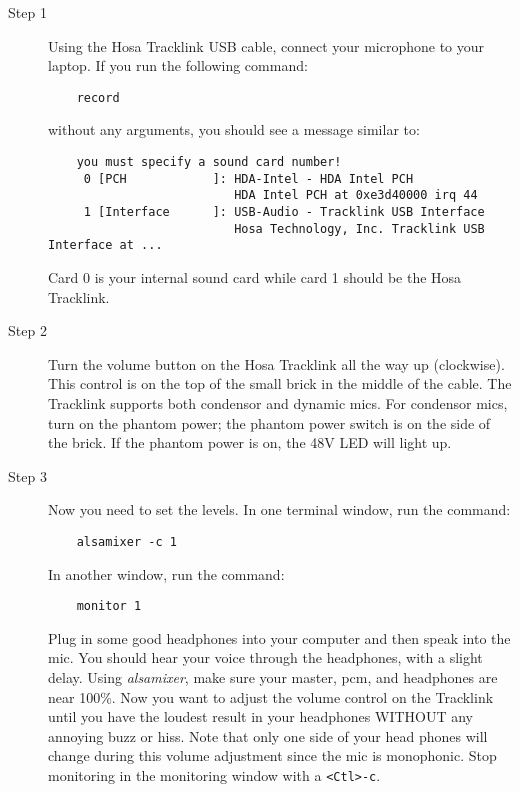 \documentclass{article}
\begin{document}
\begin{description}

\item[Step 1]

Using the Hosa Tracklink USB cable, connect your microphone
to your laptop.  If you run the following command:

\begin{verbatim}
    record
\end{verbatim}

without any arguments, you should see a message similar to:

\begin{verbatim}
    you must specify a sound card number!
     0 [PCH            ]: HDA-Intel - HDA Intel PCH
                          HDA Intel PCH at 0xe3d40000 irq 44
     1 [Interface      ]: USB-Audio - Tracklink USB Interface
                          Hosa Technology, Inc. Tracklink USB Interface at ...
        \end{verbatim}

Card 0 is your internal sound card while card 1
should be the Hosa Tracklink.

\item[Step 2]

Turn the volume button on the Hosa Tracklink all the way up (clockwise).
This control is on the top of the small brick in the middle of the 
cable.
The Tracklink supports both condensor and dynamic mics.
For condensor mics, turn on the phantom power; the phantom power
switch is on the side of the brick. If the phantom power is on,
the 48V LED will light up.

\item[Step 3]

Now you need to set the levels. In one terminal window, run the command:

\begin{verbatim}
    alsamixer -c 1
\end{verbatim}

In another window, run the command:

\begin{verbatim}
    monitor 1
\end{verbatim}

Plug in some good headphones into your computer and then
speak into the mic. You should hear your voice through the headphones,
with a slight delay.
Using {\it alsamixer},
make sure your master, pcm, and headphones are near 100\%.
Now you want to adjust the volume control on the Tracklink
until you have the loudest result in your headphones WITHOUT any
annoying buzz or hiss.
Note that only one side of your head phones
will change during this volume adjustment since the mic is monophonic.
Stop monitoring in the monitoring window with a \verb!<Ctl>-c!.


\end{description}
\end{document}
